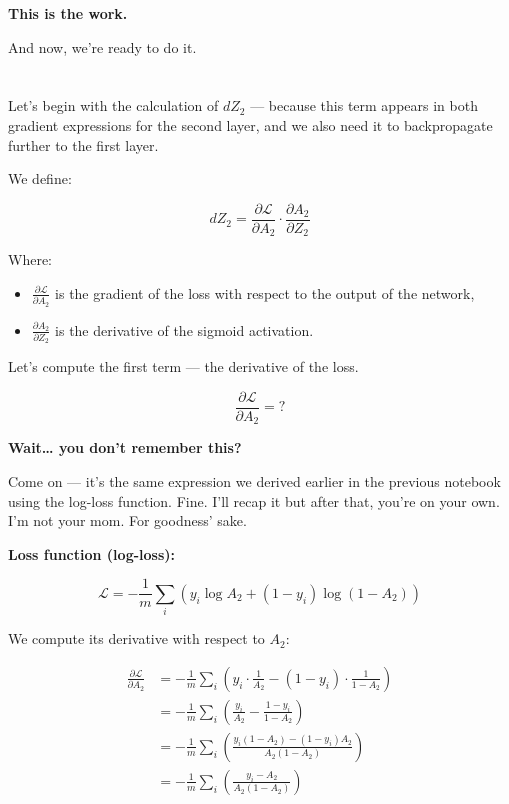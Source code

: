 \documentclass[11pt]{article}
\begin{document}
\textbf{This is the work.}

And now, we’re ready to do it.

\section*{}

Let’s begin with the calculation of \( dZ_2 \) —  
because this term appears in both gradient expressions for the second layer,  
and we also need it to backpropagate further to the first layer.

We define:

\[
dZ_2 = \frac{\partial \mathcal{L}}{\partial A_2} \cdot \frac{\partial A_2}{\partial Z_2}
\]

Where:
\begin{itemize}
    \item \( \frac{\partial \mathcal{L}}{\partial A_2} \) is the gradient of the loss with respect to the output of the network,
    \item \( \frac{\partial A_2}{\partial Z_2} \) is the derivative of the sigmoid activation.
\end{itemize}

\vspace{1em}

Let’s compute the first term — the derivative of the loss.

\[
\frac{\partial \mathcal{L}}{\partial A_2} = ?
\]

\textbf{Wait… you don’t remember this?}

Come on — it’s the same expression we derived earlier in the previous notebook using the log-loss function.  
Fine. I’ll recap it but after that, you're on your own. I'm not your mom. For goodness' sake.

\vspace{1em}

\textbf{Loss function (log-loss):}

\[
\mathcal{L} = -\frac{1}{m} \sum_i \left( y_i \log A_2 + (1 - y_i) \log(1 - A_2) \right)
\]

We compute its derivative with respect to \( A_2 \):

\[
\begin{aligned}
\frac{\partial \mathcal{L}}{\partial A_2} 
&= -\frac{1}{m} \sum_i \left( y_i \cdot \frac{1}{A_2} - (1 - y_i) \cdot \frac{1}{1 - A_2} \right) \\
&= -\frac{1}{m} \sum_i \left( \frac{y_i}{A_2} - \frac{1 - y_i}{1 - A_2} \right) \\
&= -\frac{1}{m} \sum_i \left( \frac{y_i(1 - A_2) - (1 - y_i)A_2}{A_2(1 - A_2)} \right) \\
&= -\frac{1}{m} \sum_i \left( \frac{y_i - A_2}{A_2(1 - A_2)} \right)
\end{aligned}
\]
\end{document}
